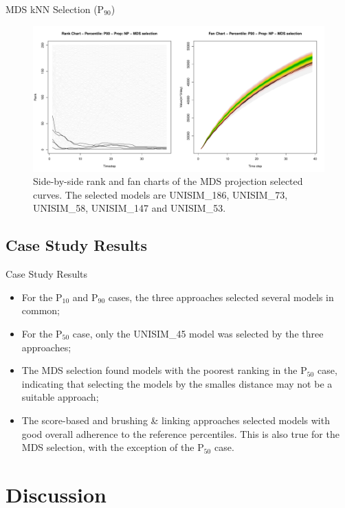 \documentclass{beamer}
\begin{document}
\begin{frame}{MDS kNN Selection (P$_{90}$)}
  \begin{figure}[H]
    \centering
    \includegraphics[width=0.9\columnwidth]{rank-fan-mds-sel-p90.pdf}
    \caption{Side-by-side rank and fan charts of the MDS projection selected curves. The selected models are UNISIM\_186, UNISIM\_73, UNISIM\_58, UNISIM\_147 and UNISIM\_53.}
    \label{fig:rank-fan-mds}
  \end{figure}
\end{frame}

\subsection{Case Study Results}
\begin{frame}{Case Study Results}
  \begin{itemize}
    \item For the P$_{10}$ and P$_{90}$ cases, the three approaches selected several models in common;
    \item For the P$_{50}$ case, only the UNISIM\_45 model was selected by the three approaches;
    \item The MDS selection found models with the poorest ranking in the P$_{50}$ case, indicating that selecting the models by the smalles distance may not be a suitable approach;
    \item The score-based and brushing \& linking approaches selected models with good overall adherence to the reference percentiles. This is also true for the MDS selection, with the exception of the P$_{50}$ case.
  \end{itemize}
\end{frame}

\section{Discussion}
\begin{frame}
  \tableofcontents[currentsection]
\end{frame}
\end{document}
